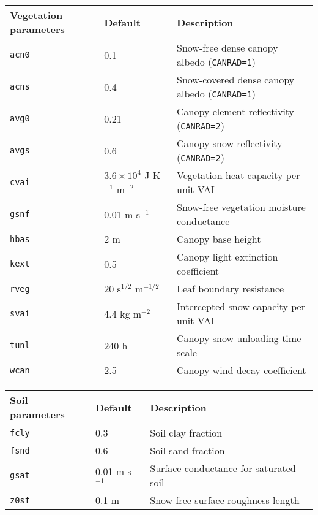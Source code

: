 \documentclass{article}
\begin{document}
\begin{longtable}{|l|l|l|} \hline
Vegetation parameters & Default       & Description                               \\ \hline
{\tt acn0} & 0.1                      & Snow-free dense canopy albedo ({\tt CANRAD=1})     \\
{\tt acns} & 0.4                      & Snow-covered dense canopy albedo ({\tt CANRAD=1})  \\  
{\tt avg0} & 0.21                     & Canopy element reflectivity ({\tt CANRAD=2})       \\
{\tt avgs} & 0.6                      & Canopy snow reflectivity ({\tt CANRAD=2})          \\  
{\tt cvai} & $3.6\times 10^4$ J K$^{-1}$ m$^{-2}$ & Vegetation heat capacity per unit VAI  \\
{\tt gsnf} & 0.01 m s$^{-1}$          & Snow-free vegetation moisture conductance \\
{\tt hbas} & 2 m                      & Canopy base height                        \\
{\tt kext} & 0.5                      & Canopy light extinction coefficient       \\
{\tt rveg} & 20 s$^{1/2}$ m$^{-1/2}$  & Leaf boundary resistance                  \\
{\tt svai} & 4.4 kg m$^{-2}$          & Intercepted snow capacity per unit VAI    \\
{\tt tunl} & 240 h                    & Canopy snow unloading time scale          \\
{\tt wcan} & 2.5                      & Canopy wind decay coefficient             \\ \hline
\end{longtable}

\begin{longtable}{|l|l|l|} \hline
Soil parameters  & Default         & Description                             \\ \hline
{\tt fcly}       & 0.3             & Soil clay fraction                      \\
{\tt fsnd}       & 0.6             & Soil sand fraction                      \\
{\tt gsat}       & 0.01 m s$^{-1}$ & Surface conductance for saturated soil  \\
{\tt z0sf}       & 0.1 m           & Snow-free surface roughness length      \\ \hline 
\end{longtable}
\end{document}
